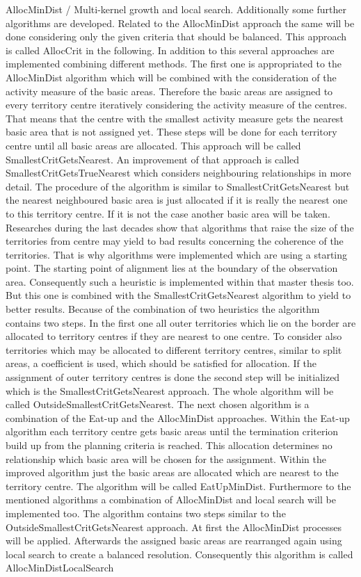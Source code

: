 AllocMinDist / Multi-kernel growth and local search. Additionally some further algorithms are developed. Related to the AllocMinDist approach the same will be done considering only the given criteria that should be balanced. This approach is called AllocCrit in the following. In addition to this several approaches are implemented combining different methods. The first one is appropriated to the AllocMinDist algorithm which will be combined with the consideration of the activity measure of the basic areas. Therefore the basic areas are assigned to every territory centre iteratively considering the activity measure of the centres. That means that the centre with the smallest activity measure gets the nearest basic area that is not assigned yet. These steps will be done for each territory centre until all basic areas are allocated. This approach will be called SmallestCritGetsNearest. An improvement of that approach is called SmallestCritGetsTrueNearest which considers neighbouring relationships in more detail. The procedure of the algorithm is similar to SmallestCritGetsNearest but the nearest neighboured basic area is just allocated if it is really the nearest one to this territory centre. If it is not the case another basic area will be taken. \\ Researches during the last decades show that algorithms that raise the size of the territories from centre may yield to bad results concerning the coherence of the territories. That is why algorithms were implemented which are using a starting point. The starting point of alignment lies at the boundary of the observation area. Consequently such a heuristic is implemented within that master thesis too. But this one is combined with the SmallestCritGetsNearest algorithm to yield to better results. Because of the combination of two heuristics the algorithm contains two steps. In the first one all outer territories which lie on the border are allocated to territory centres if they are nearest to one centre. To consider also territories which may be allocated to different territory centres, similar to split areas, a coefficient is used, which should be satisfied for allocation. If the assignment of outer territory centres is done the second step will be initialized which is the SmallestCritGetsNearest approach. The whole algorithm will be called OutsideSmallestCritGetsNearest. The next chosen algorithm is a combination of the Eat-up and the AllocMinDist approaches. Within the Eat-up algorithm each territory centre gets basic areas until the termination criterion build up from the planning criteria is reached. This allocation determines no relationship which basic area will be chosen for the assignment. Within the improved algorithm just the basic areas are allocated which are nearest to the territory centre. The algorithm will be called EatUpMinDist. Furthermore to the mentioned algorithms a combination of AllocMinDist and local search will be implemented too. The algorithm contains two steps similar to the OutsideSmallestCritGetsNearest approach. At first the AllocMinDist processes will be applied. Afterwards the assigned basic areas are rearranged again using local search to create a balanced resolution. Consequently this algorithm is called AllocMinDistLocalSearch\\
